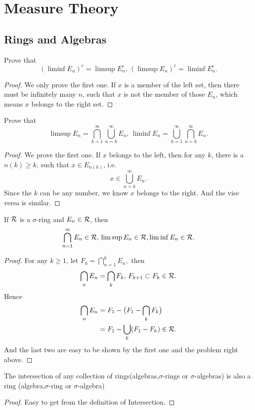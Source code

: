 \chapter{Measure Theory}
\section{Rings and Algebras}
\begin{pro}%
Prove that
	\[(\liminf E_n)^c=\limsup E_n^c,\,(\limsup E_n)^c=\liminf E_n^c.\]
\end{pro}
\begin{proof}
	We only prove the first one. If $x$ is a member of the left set, then there must be infinitely many $n$, such that $x$ is not the member of those $E_n$, which means $x$ belongs to the right set. 
\end{proof}

\begin{pro}%
	Prove that
	\[\limsup E_n=\bigcap_{k=1}^\infty \bigcup_{n=k}^\infty E_n,\,\liminf E_n=\bigcup_{k=1}^\infty \bigcap_{n=k}^\infty E_n.\]
\end{pro}
\begin{proof}
	We prove the first one. If $x$ belongs to the left, then for any $k$, there is a $n(k)\geq k$, such that $x\in E_{n(k)}$, i.e.
	\[x\in\bigcup_{n=k}^\infty E_n.\]
	Since the $k$ can be any number, we know $x$ belongs to the right. And the vise versa is similar.
\end{proof}

\begin{pro}%
	If $\mathcal{R}$ is a $\sigma$-ring and $E_n\in\mathcal{R}$, then
	\[\bigcap_{n=1}^\infty E_n\in\mathcal{R},\,\limsup E_n\in\mathcal{R},\liminf E_n\in\mathcal{R}.\]
\end{pro}
\begin{proof}
	For any $k\geq 1$, let $F_k=\bigcap_{n=1}^k E_n,$ then
	\[\bigcap_n E_n=\bigcap_k F_k,\, F_{k+1}\subset F_{k}\in\mathcal{R}.\]
	Hence
	\begin{align*}
	\bigcap_n E_n&= F_1-\big(F_1-\bigcap_k F_k\big)\\
				 &= F_1-\bigcup_k (F_1-F_k)\in\mathcal{R}.
	\end{align*}
	And the last two are easy to be shown by the first one and the problem right above.
\end{proof}

\begin{pro}%
	The intersection of any collection of rings(algebras,$\sigma$-rings or $\sigma$-algebras) is also a ring (algebra,$\sigma$-ring or $\sigma$-algebra)
\end{pro}
\begin{proof}
	Easy to get from the definition of Intersection.
\end{proof}

